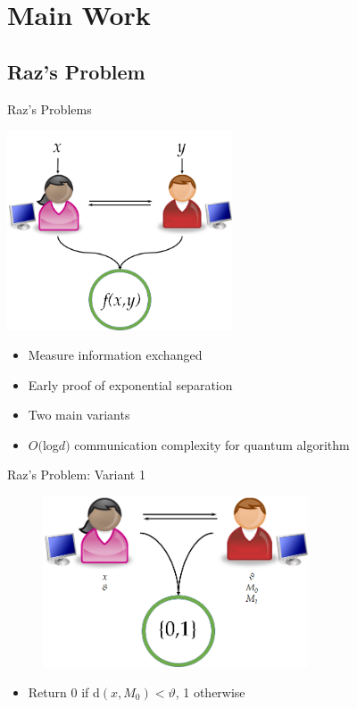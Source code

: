 \documentclass{beamer}
\begin{document}
\section{Main Work}
\subsection{Raz's Problem}
\begin{frame}{Raz's Problems}
\begin{center}
\includegraphics[width=0.5\textwidth]{twoway_communication.png}
\end{center}
\begin{itemize}
\item<2-> Measure information exchanged
\item<3-> Early proof of exponential separation
\item<4-> Two main variants
\item<5-> $O($log$d)$ communication complexity for quantum algorithm
\end{itemize}
\end{frame}

\begin{frame}{Raz's Problem: Variant 1}
\begin{figure}[!h]
\includegraphics[width=0.7\textwidth]{Raz_prob1.png}
\end{figure}
\begin{itemize}
\item Return 0 if d$(x, M_0) < \vartheta$, 1 otherwise
\end{itemize}
\end{frame}
\end{document}
